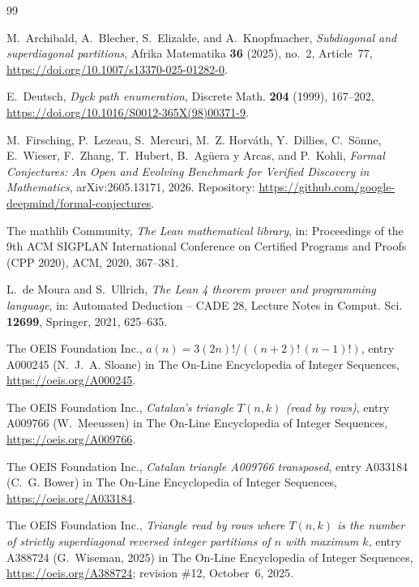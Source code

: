 \documentclass[11pt]{amsart}
\theoremstyle{plain}
\theoremstyle{definition}
\begin{document}
{\footnotesize
\begin{thebibliography}{99}

M.~Archibald, A.~Blecher, S.~Elizalde, and A.~Knopfmacher, \emph{Subdiagonal and superdiagonal partitions}, Afrika Matematika \textbf{36} (2025), no.~2, Article~77, \url{https://doi.org/10.1007/s13370-025-01282-0}.

E.~Deutsch, \emph{Dyck path enumeration}, Discrete Math. \textbf{204} (1999), 167--202, \url{https://doi.org/10.1016/S0012-365X(98)00371-9}.

M.~Firsching, P.~Lezeau, S.~Mercuri, M.~Z. Horv\'ath, Y.~Dillies, C.~S\"onne, E.~Wieser, F.~Zhang, T.~Hubert, B.~Ag\"uera y Arcas, and P.~Kohli, \emph{Formal Conjectures: An Open and Evolving Benchmark for Verified Discovery in Mathematics}, arXiv:2605.13171, 2026. Repository: \url{https://github.com/google-deepmind/formal-conjectures}.

The mathlib Community, \emph{The Lean mathematical library}, in: Proceedings of the 9th ACM SIGPLAN International Conference on Certified Programs and Proofs (CPP 2020), ACM, 2020, 367--381.

L.~de Moura and S.~Ullrich, \emph{The Lean 4 theorem prover and programming language}, in: Automated Deduction -- CADE 28, Lecture Notes in Comput. Sci. \textbf{12699}, Springer, 2021, 625--635.

The OEIS Foundation Inc., \emph{$a(n)=3(2n)!/((n+2)!\,(n-1)!)$}, entry A000245 (N.~J.~A. Sloane) in The On-Line Encyclopedia of Integer Sequences, \url{https://oeis.org/A000245}.

The OEIS Foundation Inc., \emph{Catalan's triangle $T(n,k)$ (read by rows)}, entry A009766 (W.~Meeussen) in The On-Line Encyclopedia of Integer Sequences, \url{https://oeis.org/A009766}.

The OEIS Foundation Inc., \emph{Catalan triangle A009766 transposed}, entry A033184 (C.~G. Bower) in The On-Line Encyclopedia of Integer Sequences, \url{https://oeis.org/A033184}.

The OEIS Foundation Inc., \emph{Triangle read by rows where $T(n,k)$ is the number of strictly superdiagonal reversed integer partitions of $n$ with maximum $k$}, entry A388724 (G.~Wiseman, 2025) in The On-Line Encyclopedia of Integer Sequences, \url{https://oeis.org/A388724}; revision \#12, October~6, 2025.

\end{thebibliography}
}
\end{document}
